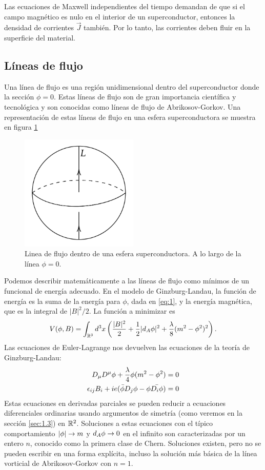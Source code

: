 Las ecuaciones de Maxwell independientes del tiempo demandan de que si el campo magnético es nulo en el interior de un superconductor, entonces la densidad de corrientes $\vec J$ también. Por lo tanto, las corrientes deben fluir en la superficie del material.

\subsection{Líneas de flujo}

Una línea de flujo es una región unidimensional dentro del superconductor donde la sección $\phi=0$. Estas líneas de flujo son de gran importancia científica y tecnológica y son conocidas como líneas de flujo de Abrikosov-Gorkov. Una representación de estas líneas de flujo en una esfera superconductora se muestra en figura \ref{fig:3}

\begin{figure}[ht]
	\centering
	\includegraphics[width=0.5\textwidth]{gfx/fluxline.png}
	\caption{Linea de flujo dentro de una esfera superconductora. A lo largo de la línea $\phi=0$.}
	\label{fig:3}
\end{figure}

Podemos describir matemáticamente a las líneas de flujo como mínimos de un funcional de energía adecuado. En el modelo de Ginzburg-Landau, la función de energía es la suma de la energía para $\phi$, dada en \eqref{eq:1}, y la energía magnética, que es la integral de $|B|^2/2$. La función a minimizar es
\begin{align}
	V(\phi,B) = \int_{\mathbb{R}^3}d^3x\left(\frac{|B|^2}{2}+\frac{1}{2}|d_A\phi|^2+\frac{\lambda}{8}(m^2-\phi^2)^2\right).
\end{align}
Las ecuaciones de Euler-Lagrange nos devuelven las ecuaciones de la teoría de Ginzburg-Landau:
\begin{align}
	D_\mu D^\mu\phi+\frac{\lambda}{4}\phi(m^2-\phi^2) &=0\\
	\epsilon_{ij}B_i+ie(\bar\phi D_j\phi-\phi\bar{D_i\phi}) &=0
\end{align}
Estas ecuaciones en derivadas parciales se pueden reducir a ecuaciones diferenciales ordinarias usando argumentos de simetría (como veremos en la sección \ref{sec:1.3}) en $\mathbb{R}^2$. Soluciones a estas ecuaciones con el típico comportamiento $|\phi|\rightarrow m$ y $d_A\phi\rightarrow 0$ en el infinito son caracterizadas por un entero $n$, conocido como la primera clase de Chern. Soluciones existen, pero no se pueden escribir en una forma explícita, incluso la solución más básica de la línea vorticial de Abrikosov-Gorkov con $n=1$.


